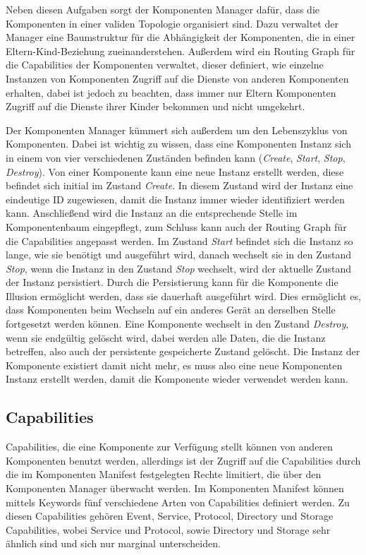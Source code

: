 \documentclass[a4paper]{scrartcl}
\begin{document}
Neben diesen Aufgaben sorgt der Komponenten Manager dafür, dass die Komponenten in einer validen Topologie organisiert sind. Dazu verwaltet der Manager eine Baumstruktur für die Abhängigkeit der Komponenten, die in einer Eltern-Kind-Beziehung zueinanderstehen. Außerdem wird ein Routing Graph für die Capabilities der Komponenten verwaltet, dieser definiert, wie einzelne Instanzen von Komponenten Zugriff auf die Dienste von anderen Komponenten erhalten, dabei ist jedoch zu beachten, dass immer nur Eltern Komponenten Zugriff auf die Dienste ihrer Kinder bekommen und nicht umgekehrt. \cite{Fuchsia.Component.Topology}

Der Komponenten Manager kümmert sich außerdem um den Lebenszyklus von Komponenten. Dabei ist wichtig zu wissen, dass eine Komponenten Instanz sich in einem von vier verschiedenen Zuständen befinden kann (\textit{Create}, \textit{Start}, \textit{Stop}, \textit{Destroy}). Von einer Komponente kann eine neue Instanz erstellt werden, diese befindet sich initial im Zustand \textit{Create}. In diesem Zustand wird der Instanz eine eindeutige ID zugewiesen, damit die Instanz immer wieder identifiziert werden kann. Anschließend wird die Instanz an die entsprechende Stelle im Komponentenbaum eingepflegt, zum Schluss kann auch der Routing Graph für die Capabilities angepasst werden. Im Zustand \textit{Start} befindet sich die Instanz so lange, wie sie benötigt und ausgeführt wird, danach wechselt sie in den Zustand \textit{Stop}, wenn die Instanz in den Zustand \textit{Stop} wechselt, wird der aktuelle Zustand der Instanz persistiert. Durch die Persistierung kann für die Komponente die Illusion ermöglicht werden, dass sie dauerhaft ausgeführt wird. Dies ermöglicht es, dass Komponenten beim Wechseln auf ein anderes Gerät an derselben Stelle fortgesetzt werden können. Eine Komponente wechselt in den Zustand \textit{Destroy}, wenn sie endgültig gelöscht wird, dabei werden alle Daten, die die Instanz betreffen, also auch der persistente gespeicherte Zustand gelöscht. Die Instanz der Komponente existiert damit nicht mehr, es muss also eine neue Komponenten Instanz erstellt werden, damit die Komponente wieder verwendet werden kann. \cite{Fuchsia.Component.Lifecycle}
\subsection{Capabilities}
\label{sec:Capabilities}
Capabilities, die eine Komponente zur Verfügung stellt können von anderen Komponenten benutzt werden, allerdings ist der Zugriff auf die Capabilities durch die im Komponenten Manifest festgelegten Rechte limitiert, die über den Komponenten Manager überwacht werden. Im Komponenten Manifest können mittels Keywords fünf verschiedene Arten von Capabilities definiert werden. Zu diesen Capabilities gehören Event, Service, Protocol, Directory und Storage Capabilities, wobei Service und Protocol, sowie Directory und Storage sehr ähnlich sind und sich nur marginal unterscheiden.
\end{document}
